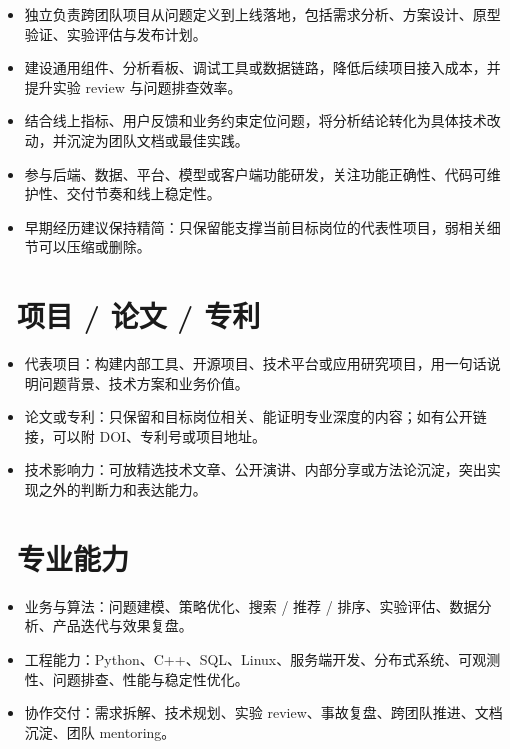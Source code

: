 \documentclass{resume}
\begin{document}
\begin{itemize}
  \item 独立负责跨团队项目从问题定义到上线落地，包括需求分析、方案设计、原型验证、实验评估与发布计划。
  \item 建设通用组件、分析看板、调试工具或数据链路，降低后续项目接入成本，并提升实验 review 与问题排查效率。
  \item 结合线上指标、用户反馈和业务约束定位问题，将分析结论转化为具体技术改动，并沉淀为团队文档或最佳实践。
\end{itemize}

\begin{itemize}
  \item 参与后端、数据、平台、模型或客户端功能研发，关注功能正确性、代码可维护性、交付节奏和线上稳定性。
  \item 早期经历建议保持精简：只保留能支撑当前目标岗位的代表性项目，弱相关细节可以压缩或删除。
\end{itemize}

\section{\faFileTextO\ 项目 / 论文 / 专利}
\begin{itemize}
  \item 代表项目：构建内部工具、开源项目、技术平台或应用研究项目，用一句话说明问题背景、技术方案和业务价值。
  \item 论文或专利：只保留和目标岗位相关、能证明专业深度的内容；如有公开链接，可以附 DOI、专利号或项目地址。
  \item 技术影响力：可放精选技术文章、公开演讲、内部分享或方法论沉淀，突出实现之外的判断力和表达能力。
\end{itemize}

\section{\faCogs\ 专业能力}
\begin{itemize}
  \item 业务与算法：问题建模、策略优化、搜索 / 推荐 / 排序、实验评估、数据分析、产品迭代与效果复盘。
  \item 工程能力：Python、C++、SQL、Linux、服务端开发、分布式系统、可观测性、问题排查、性能与稳定性优化。
  \item 协作交付：需求拆解、技术规划、实验 review、事故复盘、跨团队推进、文档沉淀、团队 mentoring。
\end{itemize}
\end{document}

